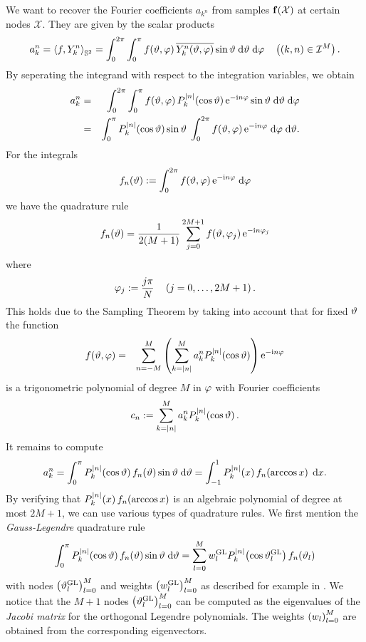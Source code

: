We want to recover the Fourier coefficients $a_{k^n}$ from samples $\mathbf{f}{\hspace{-0.4ex}}\left(\mathcal{X}\right)$ at certain nodes $\mathcal{X}$. They 
are given by the scalar products
$$
  a_{k}^n = \left<f,Y_{k}^n\right>_{\mathbb{S}^2} = \int_{0}^{2\pi} \int_{0}^{\pi} f{\hspace{-0.4ex}}\left(\vartheta,\varphi\right) \overline{Y_{k}^n{\hspace{-0.4ex}}\left(\vartheta,\varphi\right)} \sin \vartheta \; \text{\rm{d}} \vartheta \; \text{\rm{d}} \varphi \quad \left(\left(k,n\right) \in \mathcal{I}^M\right).
$$
By seperating the integrand with respect to the integration variables, we obtain
\begin{eqnarray*}
  a_{k}^n & = & \int_{0}^{2\pi} \int_{0}^{\pi} f{\hspace{-0.4ex}}\left(\vartheta,\varphi\right) P_{k}^{\left\vert n\right\vert}{\hspace{-0.4ex}}\left(\cos \vartheta\right) \mbox{\rm{e}}^{-\mbox{\scriptsize\rm{i}} n \varphi} \sin \vartheta \; \text{\rm{d}} \vartheta \; \text{\rm{d}} \varphi\\
          & = & \int_{0}^{\pi} P_{k}^{\left\vert n\right\vert}{\hspace{-0.4ex}}\left(\cos \vartheta\right) \sin \vartheta \; \int_{0}^{2\pi} f{\hspace{-0.4ex}}\left(\vartheta,\varphi\right) \mbox{\rm{e}}^{-\mbox{\scriptsize\rm{i}} n \varphi} \; \text{\rm{d}} \varphi \; \text{\rm{d}} \vartheta.
\end{eqnarray*}
For the integrals
$$
  f_{n}{\hspace{-0.4ex}}\left(\vartheta\right) := \int_{0}^{2\pi} f{\hspace{-0.4ex}}\left(\vartheta,\varphi\right) \mbox{\rm{e}}^{-\mbox{\scriptsize\rm{i}} n \varphi} \; \text{\rm{d}} \varphi
$$
we have the quadrature rule
$$ f_{n}{\hspace{-0.4ex}}\left(\vartheta\right) = \frac{1}{2(M+1)} \sum_{j=0}^{2M+1} f{\hspace{-0.4ex}}\left(\vartheta,\varphi_{j}\right) \mbox{\rm{e}}^{-\mbox{\scriptsize\rm{i}} n \varphi_{j}}$$
where
$$ \varphi_{j} := \frac{j\pi}{N} \quad \left(j=0,\ldots,2M+1\right). $$
This holds due to the Sampling Theorem by taking into account that for fixed $\vartheta$ the function
\begin{eqnarray*}
  f{\hspace{-0.4ex}}\left(\vartheta,\varphi\right) & = & \sum_{n=-M}^{M} \left(\sum_{k=\left\vert n\right\vert}^M a_{k}^n P_{k}^{\left\vert n\right\vert}{\hspace{-0.4ex}}\left(\cos \vartheta\right)\right) \mbox{\rm{e}}^{-\mbox{\scriptsize\rm{i}} n \varphi}\\
\end{eqnarray*}
is a trigonometric polynomial of degree $M$ in $\varphi$ with Fourier coefficients
$$
  c_{n} := \sum_{k=\left\vert n\right\vert}^M a_{k}^n P_{k}^{\left\vert n\right\vert}{\hspace{-0.4ex}}\left(\cos \vartheta\right).
$$
It remains to compute
$$
  a_{k}^n = \int_{0}^{\pi} P_{k}^{\left\vert n\right\vert}{\hspace{-0.4ex}}\left(\cos \vartheta\right) f_{n}{\hspace{-0.4ex}}\left(\vartheta\right) \sin \vartheta \; \text{\rm{d}} \vartheta = 
  \int_{-1}^1 P_{k}^{\left\vert n\right\vert}{\hspace{-0.4ex}}\left(x\right) f_{n}{\hspace{-0.4ex}}\left(\arccos x\right) \; \text{\rm{d}} x.
$$
By verifying that $P_{k}^{\left\vert n\right\vert}{\hspace{-0.4ex}}\left(x\right) f_{n}{\hspace{-0.4ex}}\left(\arccos x\right)$ is an algebraic polynomial of degree at most $2M+1$, 
we can use various types of quadrature rules. We first mention the \emph{Gauss-Legendre} quadrature rule
$$
  \int_{0}^{\pi} P_{k}^{\left\vert n\right\vert}{\hspace{-0.4ex}}\left(\cos \vartheta\right) f_{n}{\hspace{-0.4ex}}\left(\vartheta\right) \sin \vartheta \; \text{\rm{d}} \vartheta = \sum_{l=0}^{M} w_{l}^{\mbox{\scriptsize\rm{GL}}} P_{k}^{\left\vert n\right\vert}{\hspace{-0.4ex}}\left(\cos \vartheta_{l}^{\mbox{\scriptsize\rm{GL}}}\right) f_{n}{\hspace{-0.4ex}}\left(\vartheta_{l}\right) 
$$
with nodes $\left(\vartheta_{l}^{\mbox{\scriptsize\rm{GL}}}\right)_{l=0}^M$ and weights $\left(w_{l}^{\mbox{\scriptsize\rm{GL}}}\right)_{l=0}^M$ as described for example in \cite{boehme02}. 
We notice that the $M+1$ nodes $\left(\vartheta_{l}^{\mbox{\scriptsize\rm{GL}}}\right)_{l=0}^{M}$ can be computed as the eigenvalues of the \emph{Jacobi matrix} for the orthogonal 
Legendre polynomials. The weights $\left(w_{l}\right)_{l=0}^{M}$ are obtained from the corresponding eigenvectors.

